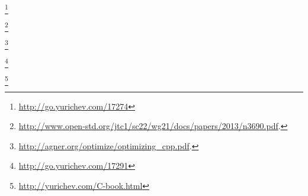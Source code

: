 \item \KRBook

\item \CNineNineStd\footnote{\AlsoAvailableAs \url{http://go.yurichev.com/17274}}

\item \TCPPPL

\item \CppOneOneStd\footnote{\AlsoAvailableAs \url{http://www.open-std.org/jtc1/sc22/wg21/docs/papers/2013/n3690.pdf}.}

\item [\AgnerFogCPP]\footnote{\AlsoAvailableAs \url{http://agner.org/optimize/optimizing_cpp.pdf}.}

\item [\ParashiftCPPFAQ]\footnote{\AlsoAvailableAs \url{http://go.yurichev.com/17291}}

\item [\CNotes]\footnote{\AlsoAvailableAs \url{http://yurichev.com/C-book.html}}

